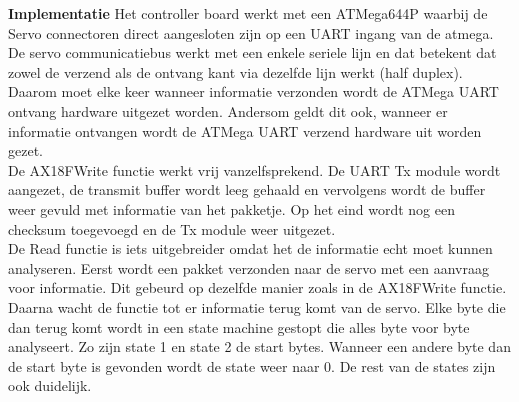 \documentclass[10pt,a4paper]{article}
\begin{document}
\textbf{Implementatie}
Het controller board werkt met een ATMega644P waarbij de Servo connectoren direct aangesloten zijn op een UART ingang van de atmega. De servo communicatiebus werkt met een enkele seriele lijn en dat betekent dat zowel de verzend als de ontvang kant via dezelfde lijn werkt (half duplex). Daarom moet elke keer wanneer informatie verzonden wordt de ATMega UART ontvang hardware uitgezet worden. Andersom geldt dit ook, wanneer er informatie ontvangen wordt de ATMega UART verzend hardware uit worden gezet.\\
De AX18FWrite functie werkt vrij vanzelfsprekend. De UART Tx module wordt aangezet, de transmit buffer wordt leeg gehaald en vervolgens wordt de buffer weer gevuld met informatie van het pakketje. Op het eind wordt nog een checksum toegevoegd en de Tx module weer uitgezet.\\



De Read functie is iets uitgebreider omdat het de informatie echt moet kunnen analyseren. Eerst wordt een pakket verzonden naar de servo met een aanvraag voor informatie. Dit gebeurd op dezelfde manier zoals in de AX18FWrite functie. Daarna wacht de functie tot er informatie terug komt van de servo. Elke byte die dan terug komt wordt in een state machine gestopt die alles byte voor byte analyseert. Zo zijn state 1 en state 2 de start bytes. Wanneer een andere byte dan de start byte is gevonden wordt de state weer naar 0. De rest van de states zijn ook duidelijk.



\end{document}
